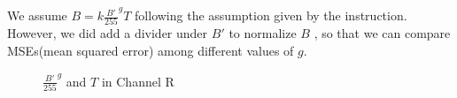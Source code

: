 \documentclass[10pt,twocolumn,letterpaper]{article}
\begin{document}
We assume $B = k\frac{B'}{255}^gT$ following the assumption given by the instruction. However, we did add a divider under $B'$ to normalize $B$ , so that we can compare MSEs(mean squared error) among different values of $g$.



\begin{figure}[t]
\centering
{}

\caption{$\frac{B'}{255}^g$ and $T$ in Channel R}
\label{fig:sampleb}
\end{figure}
\end{document}
